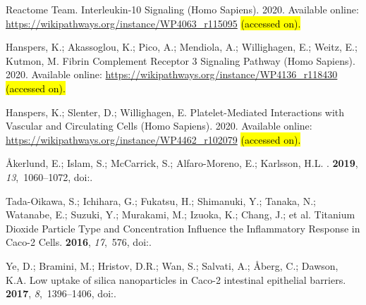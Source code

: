 \documentclass[ijms,article,accept,moreauthors,pdftex]{Definitions/mdpi}
\begin{document}
\begin{thebibliography}{999}
{Reactome Team}.
\newblock Interleukin-10 Signaling (Homo Sapiens). 2020.
\newblock Available online: \url{https://wikipathways.org/instance/WP4063_r115095} \hl{(accessed on). } %

Hanspers, K.; Akassoglou, K.; Pico, A.; Mendiola, A.; Willighagen, E.; Weitz,
  E.; Kutmon, M.
\newblock Fibrin Complement Receptor 3 Signaling Pathway (Homo Sapiens). 2020.
\newblock Available online: \url{https://wikipathways.org/instance/WP4136_r118430} \hl{(accessed on).} %

Hanspers, K.; Slenter, D.; Willighagen, E.
\newblock Platelet-Mediated Interactions with Vascular and Circulating Cells
  (Homo Sapiens). 2020.
\newblock Available online: \url{https://wikipathways.org/instance/WP4462_r102079} \hl{(accessed on). } %

{\AA}kerlund, E.; Islam, S.; McCarrick, S.; Alfaro-Moreno, E.; Karlsson, H.L.
.
 {\bf 2019}, {\em 13},~1060--1072,
\newblock
  doi:{\href{https://doi.org/10.1080/17435390.2019.1640908}{}}.

Tada-Oikawa, S.; Ichihara, G.; Fukatsu, H.; Shimanuki, Y.; Tanaka, N.;
  Watanabe, E.; Suzuki, Y.; Murakami, M.; Izuoka, K.; Chang, J.; et al.
\newblock Titanium Dioxide Particle Type and Concentration Influence the
  Inflammatory Response in Caco-2 Cells.
 {\bf 2016}, {\em
  17},~576,
\newblock
  doi:{\href{https://doi.org/10.3390/ijms17040576}{}}.

Ye, D.; Bramini, M.; Hristov, D.R.; Wan, S.; Salvati, A.; {\AA}berg, C.;
  Dawson, K.A.
\newblock Low uptake of silica nanoparticles in Caco-2 intestinal epithelial
  barriers.
 {\bf 2017}, {\em
  8},~1396--1406,
\newblock
  doi:{\href{https://doi.org/10.3762/bjnano.8.141}{}}.


\end{thebibliography}
\end{document}

